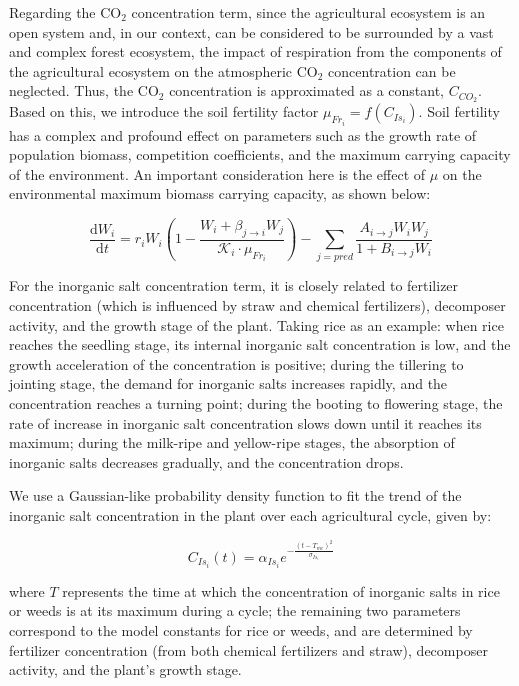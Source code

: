 \documentclass{HZNUMCM}
\begin{document}
        Regarding the CO$_2$ concentration term, 
        since the agricultural ecosystem is an open system and, 
        in our context, can be considered to be surrounded by a vast and complex forest ecosystem, 
        the impact of respiration from the components of the agricultural ecosystem on the atmospheric CO$_2$ concentration can be neglected. 
        Thus, the CO$_2$ concentration is approximated as a constant, \( C_{CO_2} \). 
        Based on this, we introduce the soil fertility factor \( \mu_{Fr_i} = f(C_{Is_i}) \). 
        Soil fertility has a complex and profound effect on parameters such as the growth rate of population biomass, 
        competition coefficients, and the maximum carrying capacity of the environment. 
        An important consideration here is the effect of \( \mu \) on the environmental maximum biomass carrying capacity, 
        as shown below:

        \[
        \frac{\mathrm{d}W_{i}}{\mathrm{d}t} = r_{i} W_{i} \left( 1 - \frac{W_{i} + \beta_{j \rightarrow i} W_{j}}{\mathscr{K}_{i} \cdot \mu_{Fr_i}} \right) - \sum_{j=pred}{\frac{A_{i\rightarrow j} W_{i} W_{j}}{1 + B_{i\rightarrow j} W_{i}}}
        \]

        For the inorganic salt concentration term, 
        it is closely related to fertilizer concentration (which is influenced by straw and chemical fertilizers), 
        decomposer activity, and the growth stage of the plant. Taking rice as an example: when rice reaches the seedling stage, 
        its internal inorganic salt concentration is low, and the growth acceleration of the concentration is positive; 
        during the tillering to jointing stage, the demand for inorganic salts increases rapidly, and the concentration reaches a turning point; 
        during the booting to flowering stage, the rate of increase in inorganic salt concentration slows down until it reaches its maximum; 
        during the milk-ripe and yellow-ripe stages, the absorption of inorganic salts decreases gradually, and the concentration drops.\cite{garcia2003logistic}
        
        We use a Gaussian-like probability density function to fit the trend of the inorganic salt concentration in the plant over each agricultural cycle, given by:
        
        \[
        C_{Is_i}(t) = \alpha_{Is_i} e^{-\frac{(t - T_{mc})^2}{\sigma_{Is_i}}}
        \]

        where \( T \) represents the time at which the concentration of inorganic salts in rice or weeds is at its maximum during a cycle; the remaining two parameters correspond to the model constants for rice or weeds, 
        and are determined by fertilizer concentration (from both chemical fertilizers and straw), decomposer activity, and the plant's growth stage.
\end{document}
